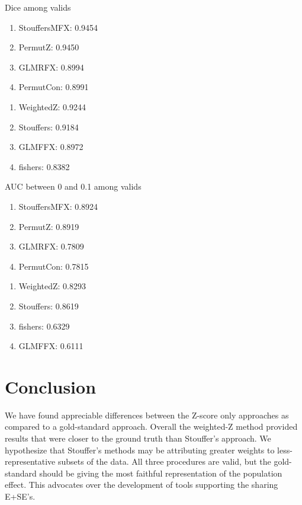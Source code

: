 \documentclass{llncs}
\begin{document}
Dice among valids
\begin{enumerate}
\item StouffersMFX: 0.9454
\item PermutZ: 0.9450
\item GLMRFX: 0.8994
\item PermutCon: 0.8991
\end{enumerate}

\begin{enumerate}
\item WeightedZ: 0.9244
\item Stouffers: 0.9184
\item GLMFFX: 0.8972
\item fishers: 0.8382
\end{enumerate}

AUC between 0 and 0.1
among valids
\begin{enumerate}
\item StouffersMFX: 0.8924
\item PermutZ: 0.8919
\item GLMRFX: 0.7809
\item PermutCon: 0.7815
\end{enumerate}

\begin{enumerate}
\item  WeightedZ: 0.8293
\item  Stouffers: 0.8619
\item  fishers: 0.6329
\item  GLMFFX: 0.6111
\end{enumerate}
    

         
       
          
       
    
       

\section{Conclusion}
We have found appreciable differences between the Z-score only approaches as compared to a gold-standard approach. Overall the weighted-Z method provided results that were closer to the ground truth than Stouffer's approach. We hypothesize that Stouffer's methods may be attributing greater weights to less-representative subsets of the data. All three procedures are valid, but the gold-standard should be giving the most faithful representation of the population effect. This advocates over the development of tools supporting the sharing E+SE's.
\end{document}
